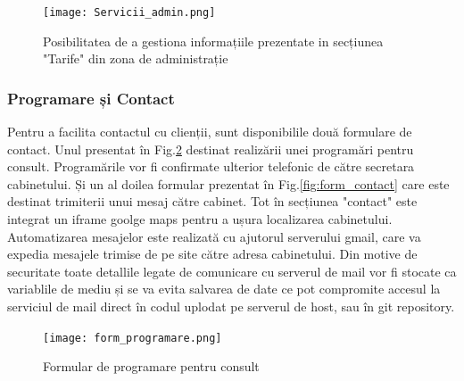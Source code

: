 \documentclass[11pt]{scrartcl} %
\begin{document}
\begin{figure}[h] %
	\centering
	\texttt{[image: Servicii\_admin.png]} %
	\caption{Posibilitatea de a gestiona informațiile prezentate in secțiunea "Tarife" din zona de administrație}
	\label{fig:serv_admin}
\end{figure}



\subsubsection{Programare și Contact}

Pentru a facilita contactul cu clienții, sunt disponibilile două formulare de contact. Unul presentat în Fig.\ref{fig:form_prog} destinat realizării unei programări pentru consult. Programările vor fi confirmate ulterior telefonic de către secretara cabinetului. Și un al doilea formular prezentat în Fig.\ref{fig:form_contact} care este destinat trimiterii unui mesaj către cabinet. Tot în secțiunea "contact" este integrat un iframe goolge maps pentru a ușura localizarea cabinetului.\\
Automatizarea mesajelor este realizată cu ajutorul serverului gmail, care va expedia mesajele trimise de pe site către adresa cabinetului. Din motive de securitate toate detallile legate de comunicare cu serverul de mail vor fi stocate ca variablile de mediu și se va evita salvarea de date ce pot compromite accesul la serviciul de mail direct în codul uplodat pe serverul de host, sau în git repository.


 

\begin{figure}[h] %
	\centering
	\texttt{[image: form\_programare.png]} %
	\caption{Formular de programare pentru consult}
	\label{fig:form_prog}
\end{figure}
\end{document}
